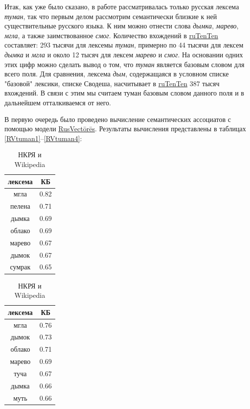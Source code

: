 \par Итак, как уже было сказано, в работе \citep{соколовский2017} рассматривалась только русская лексема \textit{туман}, так что первым делом рассмотрим семантически близкие к ней существительные русского языка. К ним можно отнести слова \textit{дымка}, \textit{марево}, \textit{мгла}, а также заимствованное \textit{смог}. Количество вхождений в \hyperlink{tenten}{ruTenTen} составляет: 293 тысячи для лексемы \textit{туман}, примерно по 44 тысячи для лексем \textit{дымка} и \textit{мгла} и около 12 тысяч для лексем \textit{марево} и \textit{смог}. На основании одних этих цифр можно сделать вывод о том, что \textit{туман} является базовым словом для всего поля. Для сравнения, лексема \textit{дым}, содержащаяся в условном списке "базовой" лексики, списке Сводеша, насчитывает в \hyperlink{tenten}{ruTenTen} 387 тысяч вхождений. В связи с этим мы считаем туман базовым словом данного поля и в дальнейшем отталкиваемся от него.

\par В первую очередь было проведено вычисление семантических ассоциатов с помощью модели \hyperlink{rusvectores}{RusVectōrēs}. Результаты вычисления представлены в таблицах \ref{RVtuman1}--\ref{RVtuman4}:

\begin{table}[H]
\begin{small}
\vspace{-5pt}
\centering
\parbox{.49\linewidth}{
\centering
\begin{tabular}{c|c}
\hline
лексема&КБ\footnotemark\\
\hline
мгла&0.82\\
пелена&0.71\\
дымка&0.69\\
облако&0.69\\
марево&0.67\\
дымок&0.67\\
сумрак&0.65\\
\hline
\end{tabular}
\caption{НКРЯ}
\label{RVtuman1}
}
\parbox{.49\linewidth}{
\centering
\begin{tabular}{c|c}
\hline
лексема&КБ\\
\hline
мгла&0.76\\
дымок&0.73\\
облако&0.71\\
марево&0.69\\
туча&0.67\\
дымка&0.66\\
муть&0.66\\
\hline
\end{tabular}
\caption{НКРЯ и Wikipedia}
\label{RVtuman2}
}
\end{small}
\end{table}

